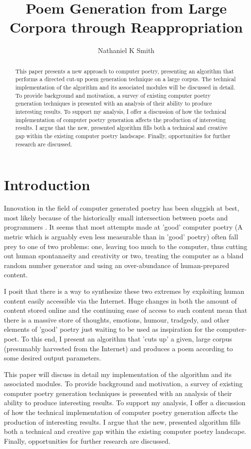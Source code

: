 \documentclass[10pt]{article}
\title{Poem Generation from Large Corpora through Reappropriation}
\author{Nathaniel K Smith}
\begin{document}
\maketitle

\begin{abstract}
This paper presents a new approach to computer poetry, presenting an algorithm
that performs a directed cut-up poem generation technique on a large corpus. The
technical implementation of the algorithm and its associated modules will be
discussed in detail. To provide background and motivation, a survey of existing
computer poetry generation techniques is presented with an analysis of their
ability to produce interesting results. To support my analysis, I offer a
discussion of how the technical implementation of computer poetry generation
affects the production of interesting results. I argue that the new, presented
algorithm fills both a technical and creative gap within the existing computer
poetry landscape. Finally, opportunities for further research are discussed.
\end{abstract}

\section{Introduction}
Innovation in the field of computer generated poetry has been sluggish at best,
most likely because of the historically small intersection between poets and
programmers \cite{Hart96}. It seems that most attempts made at 'good' computer
poetry (A metric which is arguably even less measurable than in 'good' poetry)
often fall prey to one of two problems: one, leaving too much to the computer,
thus cutting out human spontanaeity and creativity or two, treating the
computer as a bland random number generator and using an over-abundance of
human-prepared content.

I posit that there is a way to synthesize these two extremes by exploiting
human content easily accessible via the Internet. Huge changes in both the
amount of content stored online and the continuing ease of access to such
content mean that there is a massive store of thoughts, emotions, humour,
tradgedy, and other elements of 'good' poetry just waiting to be used as
inspiration for the computer-poet. To this end, I present an algorithm that
'cuts up' a given, large corpus (presumably harvested from the Internet) and
produces a poem according to some desired output parameters.

This paper will discuss in detail my implementation of the algorithm and its
associated modules. To provide background and motivation, a survey of existing
computer poetry generation techniques is presented with an analysis of their
ability to produce interesting results. To support my analysis, I offer a
discussion of how the technical implementation of computer poetry generation
affects the production of interesting results. I argue that the new, presented
algorithm fills both a technical and creative gap within the existing computer
poetry landscape. Finally, opportunities for further research are discussed.
\end{document}
